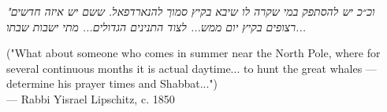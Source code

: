 
\begin{flushright}
\begin{hebrew}
\emph{"וכ״כ יש להסתפק במי שקרה לו שיבא בקיץ סמוך להנארדפאל. ששם יש איזה חדשים רצופים בקיץ יום ממש... לצוד התנינים הגדולים... מתי ישבות שבתו...}\\
\end{hebrew}
("What about someone who comes in summer near the North Pole, where for several continuous months it is actual daytime... to hunt the great whales — determine his prayer times and Shabbat...")\\
— Rabbi Yisrael Lipschitz, c. 1850
\end{flushright}